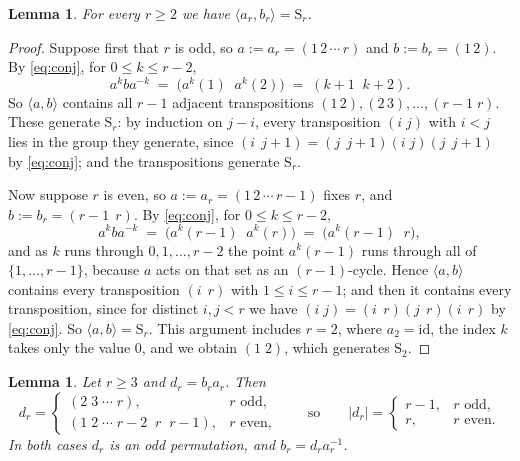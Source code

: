 \documentclass[11pt]{article}
\theoremstyle{plain}
\newtheorem{lemma}[theorem]{Lemma}
\theoremstyle{definition}
\theoremstyle{remark}
\numberwithin{equation}{section}
\newcommand{\Sym}{\mathrm{S}}
\begin{document}
\begin{lemma}
\label{lem:generate}
For every $r \ge 2$ we have $\langle a_r, b_r\rangle = \Sym_r$.
\end{lemma}

\begin{proof}
Suppose first that $r$ is odd, so $a := a_r = (1\,2\,\cdots\,r)$ and $b := b_r = (1\,2)$. By
\eqref{eq:conj}, for $0 \le k \le r-2$,
\[
a^k b a^{-k} \;=\; \bigl(a^k(1)\;\;a^k(2)\bigr) \;=\; (k+1\;\;k+2).
\]
So $\langle a,b\rangle$ contains all $r-1$ adjacent transpositions
$(1\,2), (2\,3), \dots, (r-1\;r)$. These generate $\Sym_r$: by induction on $j-i$, every
transposition $(i\;j)$ with $i < j$ lies in the group they generate, since
$(i\;\,j{+}1) = (j\;\,j{+}1)(i\;j)(j\;\,j{+}1)$ by \eqref{eq:conj}; and the transpositions
generate $\Sym_r$.

Now suppose $r$ is even, so $a := a_r = (1\,2\,\cdots\,r-1)$ fixes $r$, and
$b := b_r = (r-1\;\,r)$. By \eqref{eq:conj}, for $0 \le k \le r-2$,
\[
a^k b a^{-k} \;=\; \bigl(a^k(r-1)\;\;a^k(r)\bigr) \;=\; \bigl(a^k(r-1)\;\;r\bigr),
\]
and as $k$ runs through $0,1,\dots,r-2$ the point $a^k(r-1)$ runs through all of
$\{1,\dots,r-1\}$, because $a$ acts on that set as an $(r-1)$-cycle. Hence $\langle a,b\rangle$
contains every transposition $(i\;\,r)$ with $1 \le i \le r-1$; and then it contains every
transposition, since for distinct $i,j < r$ we have
$(i\;j) = (i\;\,r)(j\;\,r)(i\;\,r)$ by \eqref{eq:conj}. So $\langle a,b\rangle = \Sym_r$. This
argument includes $r = 2$, where $a_2 = \mathrm{id}$, the index $k$ takes only the value $0$,
and we obtain $(1\;2)$, which generates $\Sym_2$.
\end{proof}

\begin{lemma}
\label{lem:d}
Let $r \ge 3$ and $d_r = b_r a_r$. Then
\begin{equation}
\label{eq:dcycles}
d_r =
\begin{cases}
(2\;3\;\cdots\;r), & r \text{ odd},\\[2pt]
(1\;2\;\cdots\;r{-}2\;\;r\;\;r{-}1), & r \text{ even},
\end{cases}
\qquad\text{so}\qquad
|d_r| =
\begin{cases}
r-1, & r \text{ odd},\\
r, & r \text{ even}.
\end{cases}
\end{equation}
In both cases $d_r$ is an odd permutation, and $b_r = d_r a_r^{-1}$.
\end{lemma}
\end{document}
